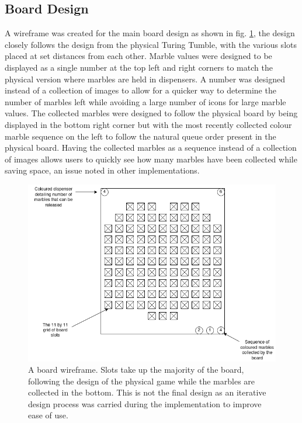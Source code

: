 \documentclass{l4proj}
\begin{document}
\subsection{Board Design}
A wireframe was created for the main board design as shown in fig. \ref{fig:boardWireframe}, the design closely follows the design from the physical Turing Tumble, with the various slots placed at set distances from each other. Marble values were designed to be displayed as a single number at the top left and right corners to match the physical version where marbles are held in dispensers. A number was designed instead of a collection of images to allow for a quicker way to determine the number of marbles left while avoiding a large number of icons for large marble values. The collected marbles were designed to follow the physical board by being displayed in the bottom right corner but with the most recently collected colour marble sequence on the left to follow the natural queue order present in the physical board. Having the collected marbles as a sequence instead of a collection of images allows users to quickly see how many marbles have been collected while saving space, an issue noted in other implementations.

\begin{figure}
    \centering
    \includegraphics[width=0.7\linewidth]{images/boardWireframe.png}
    \caption{A board wireframe. Slots take up the majority of the board, following the design of the physical game while the marbles are collected in the bottom. This is not the final design as an iterative design process was carried during the implementation to improve ease of use.}
    \label{fig:boardWireframe}
\end{figure}
\end{document}
